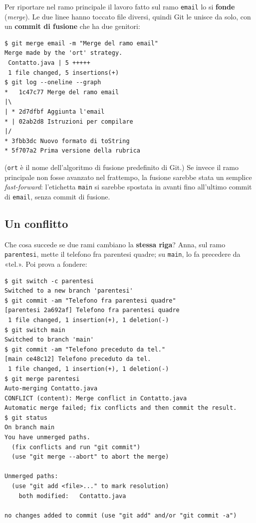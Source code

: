 Per riportare nel ramo principale il lavoro fatto sul ramo \texttt{email} lo si \textbf{fonde} (\textit{merge}). Le due
linee hanno toccato file diversi, quindi Git le unisce da solo, con un \textbf{commit di fusione} che ha due genitori:

\begin{lstlisting}[style=shell, name=Terminale di Anna, deletestring={[b]'}, deletekeywords={java}]
$ git merge email -m "Merge del ramo email"
Merge made by the 'ort' strategy.
 Contatto.java | 5 +++++
 1 file changed, 5 insertions(+)
$ git log --oneline --graph
*   1c47c77 Merge del ramo email
|\
| * 2d7dfbf Aggiunta l'email
* | 02ab2d8 Istruzioni per compilare
|/
* 3fbb3dc Nuovo formato di toString
* 5f707a2 Prima versione della rubrica
\end{lstlisting}

(\texttt{ort} è il nome dell'algoritmo di fusione predefinito di Git.) Se invece il ramo principale non fosse avanzato
nel frattempo, la fusione sarebbe stata un semplice \textit{fast-forward}: l'etichetta \texttt{main} si sarebbe spostata
in avanti fino all'ultimo commit di \texttt{email}, senza commit di fusione.

\subsection{Un conflitto}

Che cosa succede se due rami cambiano la \textbf{stessa riga}? Anna, sul ramo \texttt{parentesi}, mette il telefono fra
parentesi quadre; su \texttt{main}, lo fa precedere da «tel.». Poi prova a fondere:

\begin{lstlisting}[style=shell, name=Terminale di Anna, deletestring={[b]'}, deletekeywords={java}]
$ git switch -c parentesi
Switched to a new branch 'parentesi'
$ git commit -am "Telefono fra parentesi quadre"
[parentesi 2a692af] Telefono fra parentesi quadre
 1 file changed, 1 insertion(+), 1 deletion(-)
$ git switch main
Switched to branch 'main'
$ git commit -am "Telefono preceduto da tel."
[main ce48c12] Telefono preceduto da tel.
 1 file changed, 1 insertion(+), 1 deletion(-)
$ git merge parentesi
Auto-merging Contatto.java
CONFLICT (content): Merge conflict in Contatto.java
Automatic merge failed; fix conflicts and then commit the result.
$ git status
On branch main
You have unmerged paths.
  (fix conflicts and run "git commit")
  (use "git merge --abort" to abort the merge)

Unmerged paths:
  (use "git add <file>..." to mark resolution)
	both modified:   Contatto.java

no changes added to commit (use "git add" and/or "git commit -a")
\end{lstlisting}

